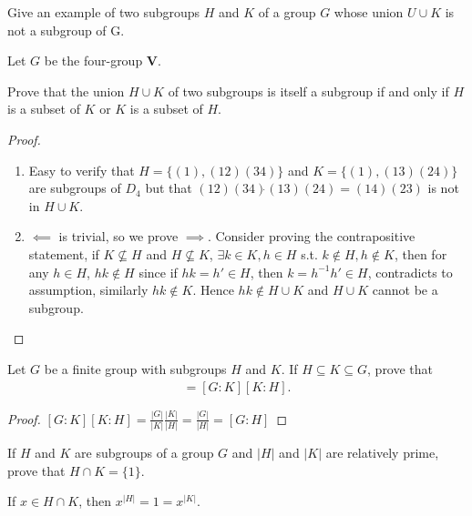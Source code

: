 \documentclass[15pt]{article}
\newenvironment{exercise}[2][Exercise]{\begin{trivlist}
\item[\hskip \labelsep {\bfseries #1}\hskip \labelsep {\bfseries #2.}]}
{\end{trivlist}}
\newenvironment{hint}[2][Hint]{\begin{trivlist}
    \item[\hskip \labelsep {\bfseries #1}\hskip \labelsep {\bfseries #2.}]}
    {\end{trivlist}}
\begin{document}
\begin{exercise}{1.40}
    \begin{enumerate}
        \item[(i)] Give an example of two subgroups $H$ and $K$ of a group $G$ whose union $U\cup K$ is not a subgroup of G. 
        \begin{hint}{} Let $G$ be the four-group $\textbf{V}$.
        \item[(ii)] Prove that the union $H\cup K$ of two subgroups is itself a subgroup if and only if $H$ is a subset of $K$
        or $K$ is a subset of $H$.
        \end{hint}
    \end{enumerate}
\end{exercise}

\begin{proof}
    \begin{enumerate}
        \item[(i)] Easy to verify that $H=\{ (1), (1 2)(3 4)\}$ and $K=\{(1), (1 3)(2 4)\}$ are subgroups of $D_4$
        but that $(1 2)(3 4)\dot{}(1 3)(2 4) = (1 4)(2 3)$ is not in $H\cup K$.
        \item[(ii)] $\impliedby$ is trivial, so we prove $\implies$. Consider proving the contrapositive statement,
        if $K\nsubseteq H$ and $H\nsubseteq K$, $\exists k\in K, h\in H$ s.t. $k\notin H, h\notin K$, then for any 
        $h\in H$, $hk \notin H$ since if $hk = h' \in H$, then $k= h^{-1}h' \in H$, contradicts to assumption, similarly
        $hk \notin K$. Hence $hk \notin H\cup K$ and $H\cup K$ cannot be a subgroup.
    \end{enumerate}
\end{proof}




\begin{exercise}{1.41}
    Let $G$ be a finite group with subgroups $H$ and $K$. If $H\subseteq K\subseteq G$, prove that
    \begin{align*}
        [G:H] = [G:K][K:H].
    \end{align*}
\end{exercise}

\begin{proof}
    $[G:K][K:H] = \frac{|G|}{|K|}\frac{|K|}{|H|} = \frac{|G|}{|H|} = [G:H]$
\end{proof}




\begin{exercise}{1.42}
    If $H$ and $K$ are subgroups of a group $G$ and $|H|$ and $|K|$ are relatively prime, prove that $H\cap K=\{1\}$.
    \begin{hint}{}
        If $x\in H\cap K$, then $x^{|H|} = 1 = x^{|K|}$.
    \end{hint}

\end{exercise}
\end{document}
